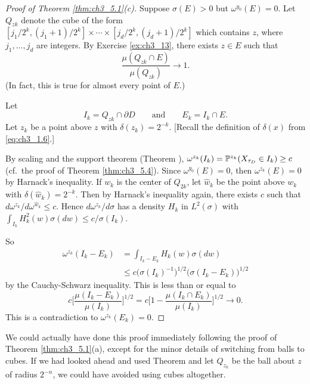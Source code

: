 \begin{proof}[Proof of Theorem \ref{thm:ch3_5.1}(c)]
Suppose $\sigma(E) > 0$ but $\omega^{y_0}(E) = 0$. Let $Q_{zk}$ denote the cube of the form $[j_1/2^k,(j_1+1)/2^k] \times \cdots \times [j_d/2^k,(j_d+1)/2^k]$ which contains $z$, where $j_1,\ldots,j_d$ are integers. By Exercise \ref{ex:ch3_13}, there exists $z \in E$ such that
\begin{equation}\label{eq:ch3_5.25}
    \frac{\mu(Q_{zk} \cap E)}{\mu(Q_{zk})} \to 1.
\end{equation}
(In fact, this is true for almost every point of $E$.)

Let
\[
    I_k = Q_{zk} \cap \partial D \qquad\text{and}\qquad E_k = I_k \cap E.
\]
Let $z_k$ be a point above $z$ with $\delta(z_k) = 2^{-k}$. [Recall the definition of $\delta(x)$ from \eqref{eq:ch3_1.6}.]

By scaling and the support theorem (Theorem ), $\omega^{z_k}(I_k) = \P^{z_k}(X_{\tau_D} \in I_k) \geq c$ (cf.\ the proof of Theorem \ref{thm:ch3_5.4}). Since $\omega^{y_0}(E) = 0$, then $\omega^{z_k}(E) = 0$ by Harnack's inequality. If $w_k$ is the center of $Q_{2k}$, let $\widehat{w}_k$ be the point above $w_k$ with $\delta(\widehat{w}_k) = 2^{-k}$. Then by Harnack's inequality again, there exists $c$ such that $d\omega^{z_k}/d\omega^{\widehat{w}_k} \leq c$. Hence $d\omega^{z_k}/d\sigma$ has a density $H_k$ in $L^2(\sigma)$ with $\int_{I_k} H_k^2(w)\sigma(dw) \leq c/\sigma(I_k)$.

\mpagebreak

So
\begin{align*}
    \omega^{z_k}(I_k - E_k) &= \int_{I_k-E_k} H_k(w)\sigma(dw) \\
    &\leq c\Big(\sigma(I_k)^{-1}\Big)^{1/2}\Big(\sigma(I_k - E_k)\Big)^{1/2}
\end{align*}
by the Cauchy-Schwarz inequality. This is less than or equal to
\[
    c\Big[\frac{\mu(I_k - E_k)}{\mu(I_k)}\Big]^{1/2} = c\Big[1 - \frac{\mu(I_k \cap E_k)}{\mu(I_k)}\Big]^{1/2} \to 0.
\]
This is a contradiction to $\omega^{z_k}(E_k) = 0$.
\end{proof}

We could actually have done this proof immediately following the proof of Theorem \ref{thm:ch3_5.1}(a), except for the minor details of switching from balls to cubes. If we had looked ahead and used Theorem  and let $Q_{z_k}$ be the ball about $z$ of radius $2^{-n}$, we could have avoided using cubes altogether.

